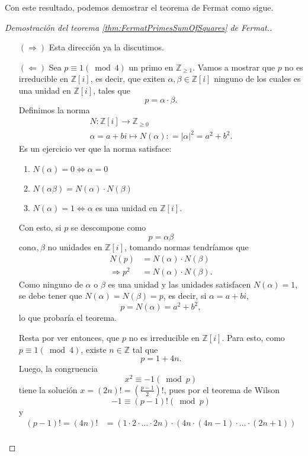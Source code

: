 \documentclass{amsbook}
\renewcommand{\.}{\cdot}
\renewcommand{\:}{\colon}               %
\newcommand{\bZ}{\mathbb{Z}}    %
\newcommand{\To}{\Rightarrow}
\newcommand{\al}{\alpha}                %
\newcommand{\bt}{\beta}                 %
\theoremstyle{plain}
\theoremstyle{definition}
\theoremstyle{remark}
\numberwithin{equation}{section}
\begin{document}
Con este resultado, podemos demostrar el teorema de Fermat como sigue.

\begin{proof}[Demostración del teorema \ref{thm:FermatPrimesSumOfSquares} de Fermat.]
    \begin{enumerate}
        \item[$(\To)$] Esta dirección ya la discutimos.
        \item[$(\Leftarrow)$] Sea $p\equiv 1(\bmod 4)$ un primo en $\bZ_{\geq 1}$. Vamos a mostrar que $p$ no es irreducible en $\bZ[i]$, es decir, que exiten $\al,\bt\in\bZ[i]$ ninguno de los cuales es una unidad en $\bZ[i]$, tales que 
        $$p=\al\.\bt.$$
        Definimos la norma 
        \begin{gather*}
        N\:\bZ[i]\to\bZ_{\geq 0}\\
        \al=a+bi\mapsto N(\al)\:=|\al|^2=a^2+b^2.
        \end{gather*}
        Es un ejercicio ver que la norma satisface:
        \begin{enumerate}[label=(\roman*)]
            \item $N(\al)=0\iff\al=0$
            \item $N(\al\bt)=N(\al)\.N(\bt)$
            \item $N(\al)=1\iff\al$ es una unidad en $\bZ[i]$.
        \end{enumerate}
        Con esto, si $p$ se descompone como %
        $$p=\al\bt$$
        con$\al,\bt$ no unidades en $\bZ[i]$, tomando normas tendríamos que
        \begin{align*}
            N(p)&=N(\al)\.N(\bt)\\
            \To p^2&=N(\al)\.N(\bt).
        \end{align*}
        Como ninguno de $\al$ o $\bt$ es una unidad y las unidades satisfacen $N(\al)=1$, se debe tener que $N(\al)=N(\bt)=p$, es decir, si $\al=a+bi$,
        $$p=N(\al)=a^2+b^2,$$
        lo que probaría el teorema.\par 
        Resta por ver entonces, que $p$ no es irreducible en $\bZ[i]$. Para esto, como $p\equiv 1(\bmod 4)$, existe $n\in\bZ$ tal que
        $$p=1+4n.$$
        Luego, la congruencia 
        $$x^2\equiv-1(\bmod p)$$
        tiene la solución $x=(2n)!=\left(\frac{p-1}{2}\right)!$, pues por el teorema de Wilson
        $$-1\equiv(p-1)!(\bmod p)$$
        y 
        \begin{align*}
            (p-1)!=(4n)!&=(1\.2\.\dots\.2n)\.(4n\.(4n-1)\.\dots\.(2n+1))\\

\end{align*}
\end{enumerate}
\end{proof}
\end{document}
